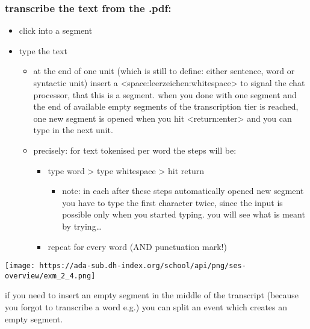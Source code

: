 \documentclass[
  12pt,
]{article}
\providecommand{\tightlist}{%
  \setlength{\itemsep}{0pt}\setlength{\parskip}{0pt}}
\begin{document}
\hypertarget{transcribe-the-text-from-the-.pdf}{%
\subsubsection{transcribe the text from the
.pdf:}\label{transcribe-the-text-from-the-.pdf}}

\begin{itemize}
\tightlist
\item
  click into a segment
\item
  type the text

  \begin{itemize}
  \tightlist
  \item
    at the end of one unit (which is still to define: either sentence,
    word or syntactic unit) insert a
    \textless space:leerzeichen:whitespace\textgreater{} to signal the
    chat processor, that this is a segment. when you done with one
    segment and the end of available empty segments of the transcription
    tier is reached, one new segment is opened when you hit
    \textless return:enter\textgreater{} and you can type in the next
    unit.
  \item
    precisely: for text tokenised per word the steps will be:

    \begin{itemize}
    \tightlist
    \item
      type word \textgreater{} type whitespace \textgreater{} hit return

      \begin{itemize}
      \tightlist
      \item
        note: in each after these steps automatically opened new segment
        you have to type the first character twice, since the input is
        possible only when you started typing. you will see what is
        meant by trying\ldots{}
      \end{itemize}
    \item
      repeat for every word (AND punctuation mark!)
    \end{itemize}
  \end{itemize}
\end{itemize}

\texttt{[image: https://ada-sub.dh-index.org/school/api/png/ses-overview/exm\_2\_4.png]}

if you need to insert an empty segment in the middle of the transcript
(because you forgot to transcribe a word e.g.) you can split an event
which creates an empty segment.
\end{document}
